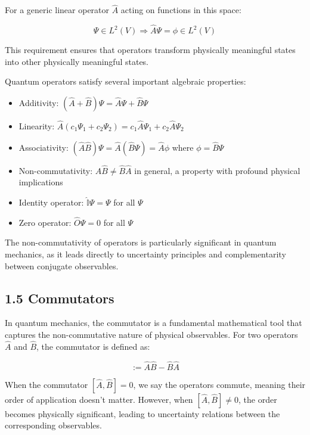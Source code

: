 \documentclass[10pt]{article}
\begin{document}
For a generic linear operator $\hat{A}$ acting on functions in this space:

\begin{equation*}
\Psi \in L^{2}(V) \Rightarrow \hat{A}\Psi = \phi \in L^{2}(V) \tag{1.51}
\end{equation*}

This requirement ensures that operators transform physically meaningful states into other physically meaningful states.

Quantum operators satisfy several important algebraic properties:

\begin{itemize}
  \item Additivity: $(\hat{A}+\hat{B})\Psi = \hat{A}\Psi + \hat{B}\Psi$
  \item Linearity: $\hat{A}(c_{1}\Psi_{1} + c_{2}\Psi_{2}) = c_{1}\hat{A}\Psi_{1} + c_{2}\hat{A}\Psi_{2}$
  \item Associativity: $(\hat{A}\hat{B})\Psi = \hat{A}(\hat{B}\Psi) = \hat{A}\phi$ where $\phi = \hat{B}\Psi$
  \item Non-commutativity: $\hat{A}\hat{B} \neq \hat{B}\hat{A}$ in general, a property with profound physical implications
  \item Identity operator: $\hat{\mathbb{I}}\Psi = \Psi$ for all $\Psi$
  \item Zero operator: $\hat{O}\Psi = 0$ for all $\Psi$
\end{itemize}

The non-commutativity of operators is particularly significant in quantum mechanics, as it leads directly to uncertainty principles and complementarity between conjugate observables.


\subsection*{1.5 Commutators}

In quantum mechanics, the commutator is a fundamental mathematical tool that captures the non-commutative nature of physical observables. For two operators $\hat{A}$ and $\hat{B}$, the commutator is defined as:

\begin{equation*}
[\hat{A}, \hat{B}] := \hat{A}\hat{B} - \hat{B}\hat{A} \tag{1.52}
\end{equation*}

When the commutator $[\hat{A}, \hat{B}] = 0$, we say the operators commute, meaning their order of application doesn't matter. However, when $[\hat{A}, \hat{B}] \neq 0$, the order becomes physically significant, leading to uncertainty relations between the corresponding observables.
\end{document}
